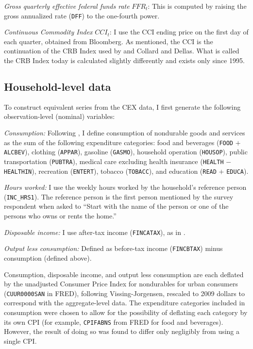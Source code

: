 \textit{Gross quarterly effective federal funds rate} $FFR_t$: This is computed by raising the gross annualized rate (\texttt{DFF}) to the one-fourth power.

\textit{Continuous Commodity Index} $CCI_t$: I use the CCI ending price on the first day of each quarter, obtained from Bloomberg. As mentioned, the CCI is the continuation of the CRB Index used by \cite{canzoneri07} and Collard and Dellas. What is called the CRB Index today is calculated slightly differently and exists only since 1995.



\subsection{Household-level data}
\label{household-data-appendix}

To construct equivalent series from the CEX data, I first generate the following observation-level (nominal) variables:

\textit{Consumption:} Following \cite{heathcote10}, I define consumption of nondurable goods and services as the sum of the following expenditure categories: food and beverages (\texttt{FOOD} $+$ \texttt{ALCBEV}), clothing (\texttt{APPAR}), gasoline (\texttt{GASMO}), household operation (\texttt{HOUSOP}), public transportation (\texttt{PUBTRA}), medical care excluding health insurance (\texttt{HEALTH} $-$ \texttt{HEALTHIN}), recreation (\texttt{ENTERT}), tobacco (\texttt{TOBACC}), and education (\texttt{READ} $+$ \texttt{EDUCA}).

\textit{Hours worked:} I use the weekly hours worked by the household's reference person (\texttt{INC\_HRS1}). The reference person is the first person mentioned by the survey respondent when asked to ``Start with the name of the person or one of the persons who owns or rents the home.''

\textit{Disposable income:}  I use after-tax income (\texttt{FINCATAX}), as in \cite{krueger15}.

\textit{Output less consumption:} Defined as before-tax income (\texttt{FINCBTAX}) minus consumption (defined above).

Consumption, disposable income, and output less consumption are each deflated by the unadjusted Consumer Price Index for nondurables for urban consumers (\texttt{CUUR0000SAN} in FRED), following Vissing-Jorgensen, rescaled to 2009 dollars to correspond with the aggregate-level data. The expenditure categories included in consumption were chosen to allow for the possibility of deflating each category by its own CPI (for example, \texttt{CPIFABNS} from FRED for food and beverages). However, the result of doing so was found to differ only negligibly from using a single CPI.

